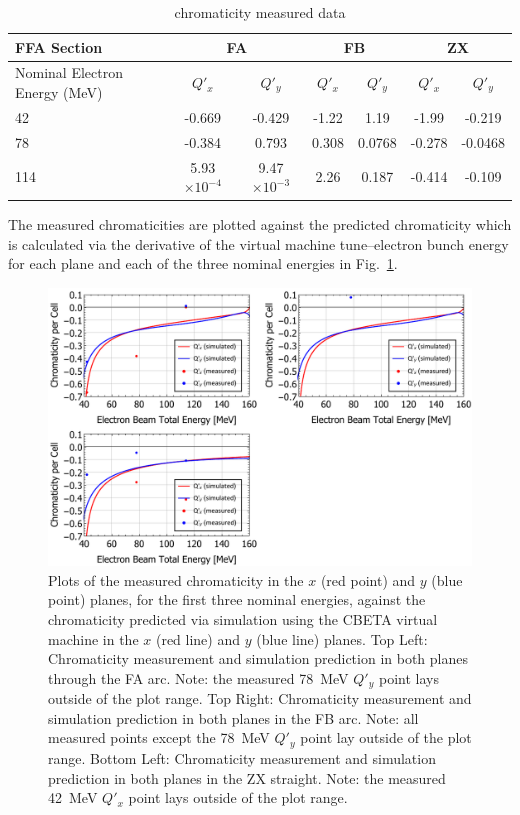 \documentclass[../main.tex]{subfiles}
\begin{document}
\begin{table}[!h]
\centering
\caption{chromaticity measured data}
\begin{tabular}{lcccccc}
\hline\hline
FFA Section & \multicolumn{2}{c}{FA} & \multicolumn{2}{c}{FB} & \multicolumn{2}{c}{ZX} \\
\hline
Nominal Electron Energy (\si{\mega\electronvolt}) & $Q'_{x}$ & $Q'_{y}$ & $Q'_{x}$ & $Q'_{y}$ & $Q'_{x}$ & $Q'_{y}$ \\
\hline
42 & -0.669 & -0.429 & -1.22 & 1.19 & -1.99 & -0.219 \\
78 & -0.384 & 0.793 & 0.308 & 0.0768 & -0.278 & -0.0468 \\
114 & 5.93$\times 10^{-4}$ & 9.47$\times 10^{-3}$ & 2.26 & 0.187 & -0.414 & -0.109 \\ 
\hline\hline
\end{tabular}
\label{tab:FAFBZX_measured_chromaticity}
\end{table}

The measured chromaticities are plotted against the predicted chromaticity which is calculated via the derivative of the virtual machine tune--electron bunch energy for each plane and each of the three nominal energies in Fig.~\ref{fig:FAFBZX_chromaticity}. 

\begin{figure}[!h]
\centering
\includegraphics[width=\textwidth]{Figures/CBETA_Multi-Pass_Commissioning/chromaticity/FAFBZX_chromaticity.pdf}
\caption{Plots of the measured chromaticity in the $x$ (red point) and $y$ (blue point) planes, for the first three nominal energies, against the chromaticity predicted via simulation using the CBETA virtual machine in the $x$ (red line) and $y$ (blue line) planes. Top Left: Chromaticity measurement and simulation prediction in both planes through the FA arc. Note: the measured 78~\si{\mega\electronvolt} $Q'_{y}$ point lays outside of the plot range. Top Right: Chromaticity measurement and simulation prediction in both planes in the FB arc. Note: all measured points except the 78~\si{\mega\electronvolt} $Q'_{y}$ point lay outside of the plot range. Bottom Left: Chromaticity measurement and simulation prediction in both planes in the ZX straight. Note: the measured 42~\si{\mega\electronvolt} $Q'_{x}$ point lays outside of the plot range.}
\label{fig:FAFBZX_chromaticity}
\end{figure}
\end{document}
